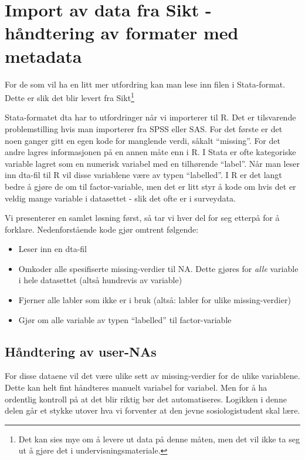 \documentclass[
  letterpaper,
  DIV=11,
  numbers=noendperiod]{scrreprt}
\providecommand{\tightlist}{%
  \setlength{\itemsep}{0pt}\setlength{\parskip}{0pt}}\usepackage{longtable,booktabs,array}
\theoremstyle{definition}
\theoremstyle{remark}
\begin{document}
\hypertarget{import-av-data-fra-sikt---huxe5ndtering-av-formater-med-metadata}{%
\chapter{Import av data fra Sikt - håndtering av formater med
metadata}\label{import-av-data-fra-sikt---huxe5ndtering-av-formater-med-metadata}}

For de som vil ha en litt mer utfordring kan man lese inn filen i
Stata-format. Dette er slik det blir levert fra Sikt\footnote{Det kan
  sies mye om å levere ut data på denne måten, men det vil ikke ta seg
  ut å gjøre det i undervisningsmateriale.}

Stata-formatet dta har to utfordringer når vi importerer til R. Det er
tilsvarende problemstilling hvis man importerer fra SPSS eller SAS. For
det første er det noen ganger gitt en egen kode for manglende verdi,
såkalt ``missing''. For det andre lagres informasjonen på en annen måte
enn i R. I Stata er ofte kategoriske variable lagret som en numerisk
variabel med en tilhørende ``label''. Når man leser inn dta-fil til R
vil disse variablene være av typen ``labelled''. I R er det langt bedre
å gjøre de om til factor-variable, men det er litt styr å kode om hvis
det er veldig mange variable i datasettet - slik det ofte er i
surveydata.

Vi presenterer en samlet løsning først, så tar vi hver del for seg
etterpå for å forklare. Nedenforstående kode gjør omtrent følgende:

\begin{itemize}
\tightlist
\item
  Leser inn en dta-fil
\item
  Omkoder alle spesifiserte missing-verdier til NA. Dette gjøres for
  \emph{alle} variable i hele datasettet (altså hundrevis av variable)
\item
  Fjerner alle labler som ikke er i bruk (altså: labler for ulike
  missing-verdier)
\item
  Gjør om alle variable av typen ``labelled'' til factor-variable
\end{itemize}

\hypertarget{huxe5ndtering-av-user-nas}{%
\section{Håndtering av user-NAs}\label{huxe5ndtering-av-user-nas}}

For disse dataene vil det være ulike sett av missing-verdier for de
ulike variablene. Dette kan helt fint håndteres manuelt variabel for
variabel. Men for å ha ordentlig kontroll på at det blir riktig bør det
automatiseres. Logikken i denne delen går et stykke utover hva vi
forventer at den jevne sosiologistudent skal lære.
\end{document}
